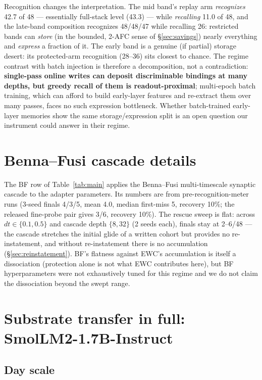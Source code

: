 \documentclass[11pt]{article}
\newcommand{\smol}{SmolLM2-1.7B-Instruct}
\begin{document}
Recognition changes the interpretation. The mid band's replay arm \emph{recognizes} 42.7 of 48
--- essentially full-stack level (43.3) --- while \emph{recalling} 11.0 of 48, and the late-band
composition recognizes 48/48/47 while recalling 26: restricted bands can \emph{store} (in the
bounded, 2-AFC sense of \S\ref{sec:savings}) nearly everything and \emph{express} a fraction of
it. The early band is a genuine (if partial) storage desert: its protected-arm recognition
(28--36) sits closest to chance. The regime contrast with batch injection \citep{back2026lora}
is therefore a decomposition, not a contradiction: \textbf{single-pass online writes can deposit
discriminable bindings at many depths, but greedy recall of them is readout-proximal};
multi-epoch batch training, which can afford to build early-layer features and re-extract them
over many passes, faces no such expression bottleneck. Whether batch-trained early-layer
memories show the same storage/expression split is an open question our instrument could answer
in their regime.

\section{Benna--Fusi cascade details}\label{app:bf}

The BF row of Table~\ref{tab:main} applies the Benna--Fusi multi-timescale synaptic cascade
\citep{benna2016} to the adapter parameters. Its numbers are from pre-recognition-meter runs
(3-seed finals 4/3/5, mean 4.0, median first-miss 5, recovery 10\%; the released fine-probe pair
gives 3/6, recovery 10\%). The rescue sweep is flat: across $dt\in\{0.1,0.5\}$ and cascade depth
$\{8,32\}$ (2 seeds each), finals stay at 2--6/48 --- the cascade stretches the initial glide of
a written cohort but provides no re-instatement, and without re-instatement there is no
accumulation (\S\ref{sec:reinstatement}). BF's flatness against EWC's accumulation is itself a
dissociation (protection alone is not what EWC contributes here), but BF hyperparameters were
not exhaustively tuned for this regime and we do not claim the dissociation beyond the swept
range.

\section{Substrate transfer in full: \smol{}}\label{app:transfer}

\subsection{Day scale}
\end{document}

